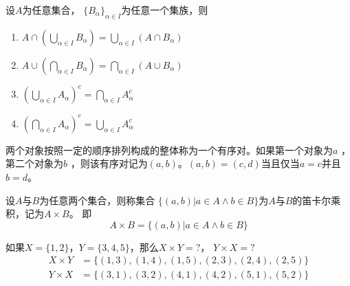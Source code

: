   \begin{Thm}
设$A$为任意集合， $\{B_{\alpha}\}_{\alpha \in I}$为任意一个集族，则
\begin{enumerate}
\item $A \cap (\bigcup_{\alpha \in I}B_{\alpha}) = \bigcup_{\alpha \in I}(A \cap B_{\alpha})$
\item $A \cup (\bigcap_{\alpha \in I}B_{\alpha}) = \bigcap_{\alpha \in I}(A \cup B_{\alpha})$
\item $(\bigcup_{\alpha \in I}A_{\alpha})^c=\bigcap_{\alpha\in I}A_{\alpha}^c$
\item $(\bigcap_{\alpha \in I}A_{\alpha})^c=\bigcup_{\alpha\in I}A_{\alpha}^c$
\end{enumerate}
\end{Thm}
  \begin{Def}
    两个对象按照一定的顺序排列构成的整体称为一个有序对。如果第一个对象为$a$ ，第二个对象为$b$ ，则该有序对记为$(a,b)$。$(a,b)=(c,d)$当且仅当$a=c$并且$b=d$。
  \end{Def}
  \begin{Def}
    设$A$与$B$为任意两个集合，则称集合 $\{(a,b)|a\in A \land b \in B\}$为$A$与$B$的笛卡尔乘积，记为$A \times B$。
即
\begin{equation*}
  A \times B = \{(a,b)|a \in A \land b \in B\}
\end{equation*}
  \end{Def}
  \begin{Example}
    如果$X=\{1,2\}$，$Y=\{3,4,5\}$，那么$X \times Y = ?$， $Y \times X = ?$
    \begin{equation*}
      \begin{split}
       X \times Y &= \{ (1,3), (1,4), (1,5), (2,3), (2,4), (2, 5) \}\\
       Y \times X &= \{(3,1), (3,2), (4,1), (4,2), (5,1), (5,2)\}
      \end{split}
    \end{equation*}
  \end{Example}

